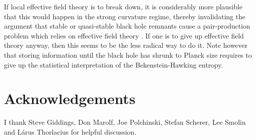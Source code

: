 \documentclass[12pt]{article}
\begin{document}
If local effective field theory is to break down, it
is considerably more plausible that this would happen in the
strong curvature regime, thereby invalidating the argument that 
stable or quasi-stable black hole remnants cause a pair-production
problem which relies on effective field theory \cite{Hossenfelder:2009xq}. 
If one is to give up effective field theory anyway, then this seems to be 
the less radical way to do it. Note however that storing information
until the black hole has shrunk to Planck size requires to give
up the statistical interpretation of the Bekenstein-Hawking entropy.

\section*{Acknowledgements}

I thank Steve Giddings, Don Marolf, Joe Polchinski, Stefan Scherer, Lee Smolin and L\'arus Thorlacius
for helpful discussion.
\end{document}

